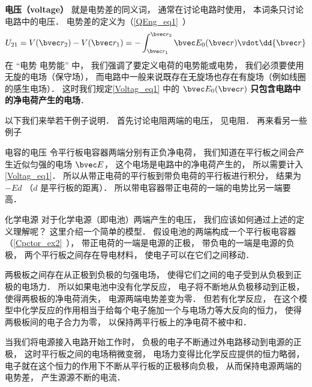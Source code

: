 

\textbf{电压（voltage）} 就是电势差的同义词， 通常在讨论电路时使用， 本词条只讨论电路中的电压． 电势差的定义为（\autoref{QEng_eq1}~）
\begin{equation}\label{Voltag_eq1}
U_{21} = V(\bvec r_2) - V(\bvec r_1) = - \int_{\bvec r_1}^{\bvec r_2} \bvec E_0(\bvec r) \vdot \dd{\bvec r}
\end{equation}
在 “电势 电势能” 中， 我们强调了要定义电荷的电势能或电势， 我们必须要使用无旋的电场（保守场）， 而电路中一般来说既存在无旋场也存在有旋场（例如线圈的感生电场）． 这时我们规定\autoref{Voltag_eq1} 中的 $\bvec E_0(\bvec r)$ \textbf{只包含电路中的净电荷产生的电场}．

以下我们来举若干例子说明． 首先讨论电阻两端的电压， 见电阻． 再来看另一些例子

\begin{example}{电容的电压}
令平行板电容器两端分别有正负净电荷， 我们知道在平行板之间会产生近似匀强的电场 $\bvec E$， 这个电场是电路中的净电荷产生的， 所以需要计入\autoref{Voltag_eq1}． 所以从带正电荷的平行板到带负电荷的平行板进行积分， 结果为 $-E d$ （$d$ 是平行板的距离）． 所以带电容器带正电荷的一端的电势比另一端要高．
\end{example}

\begin{example}{化学电源}
对于化学电源（即电池）两端产生的电压， 我们应该如何通过上述的定义理解呢？ 这里介绍一个简单的模型． 假设电池的两端构成一个平行板电容器（\autoref{Cpctor_ex2}~）， 带正电荷的一端是电源的正极， 带负电的一端是电源的负极， 两个平行板之间存在导电材料， 使电子可以在它们之间移动．

两极板之间存在从正极到负极的匀强电场， 使得它们之间的电子受到从负极到正极的电场力． 所以如果电池中没有化学反应， 电子将不断地从负极移动到正极， 使得两极板的净电荷消失， 电源两端电势差变为零． 但若有化学反应， 在这个模型中化学反应的作用相当于给每个电子施加一个与电场力等大反向的恒力， 使得两极板间的电子合力为零， 以保持两平行板上的净电荷不被中和．

当我们将电源接入电路开始工作时， 负极的电子不断通过外电路移动到电源的正极， 这时平行板之间的电场稍微变弱， 电场力变得比化学反应提供的恒力略弱， 电子就在这个恒力的作用下不断从平行板的正极移向负极， 从而保持电源两端的电势差， 产生源源不断的电流．
\end{example}


